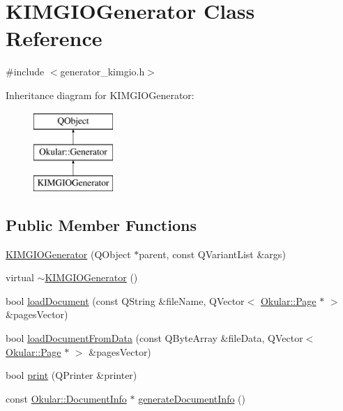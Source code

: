 \hypertarget{classKIMGIOGenerator}{\section{K\+I\+M\+G\+I\+O\+Generator Class Reference}
\label{classKIMGIOGenerator}
}


{\ttfamily \#include $<$generator\+\_\+kimgio.\+h$>$}

Inheritance diagram for K\+I\+M\+G\+I\+O\+Generator\+:\begin{figure}[H]
\begin{center}
\leavevmode
\includegraphics[height=3.000000cm]{classKIMGIOGenerator}
\end{center}
\end{figure}
\subsection*{Public Member Functions}
\begin{DoxyCompactItemize}
\item 
\hyperlink{classKIMGIOGenerator_a9f7c9c6ddea5f552021d55b4522354c1}{K\+I\+M\+G\+I\+O\+Generator} (Q\+Object $\ast$parent, const Q\+Variant\+List \&args)
\item 
virtual \hyperlink{classKIMGIOGenerator_a889d228f1a5451f37e9dbd24ae166371}{$\sim$\+K\+I\+M\+G\+I\+O\+Generator} ()
\item 
bool \hyperlink{classKIMGIOGenerator_a81bb4e1e5f4e658a13d26643969deb4e}{load\+Document} (const Q\+String \&file\+Name, Q\+Vector$<$ \hyperlink{classOkular_1_1Page}{Okular\+::\+Page} $\ast$ $>$ \&pages\+Vector)
\item 
bool \hyperlink{classKIMGIOGenerator_ab087aca450c315f9c8ac421eb6695aed}{load\+Document\+From\+Data} (const Q\+Byte\+Array \&file\+Data, Q\+Vector$<$ \hyperlink{classOkular_1_1Page}{Okular\+::\+Page} $\ast$ $>$ \&pages\+Vector)
\item 
bool \hyperlink{classKIMGIOGenerator_abc6d7a3445fc9aa1857694b5229a31b9}{print} (Q\+Printer \&printer)
\item 
const \hyperlink{classOkular_1_1DocumentInfo}{Okular\+::\+Document\+Info} $\ast$ \hyperlink{classKIMGIOGenerator_af71464335590219ecdef032d6cb7d379}{generate\+Document\+Info} ()
\end{DoxyCompactItemize}
